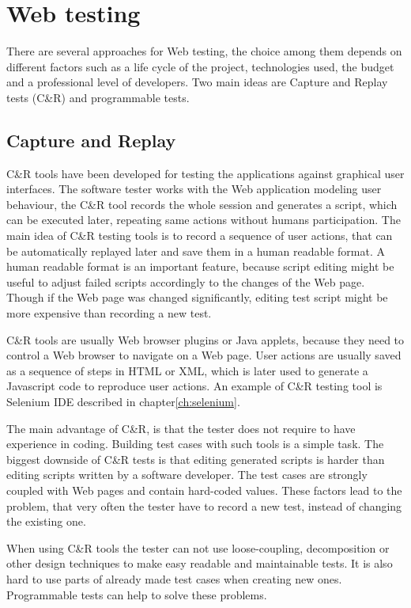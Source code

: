 	\chapter{Web testing}
	\label{ch:Webtesting}

		There are several approaches for Web testing, the choice among them depends on
		different factors such as a life cycle of the project, technologies used, the
		budget and a professional level of developers. Two main ideas are Capture
		and Replay tests (C\&R) and programmable tests.
		
\section{Capture and Replay}
\label{sec:captureReplay}
C\&R tools have been developed for testing the applications against graphical user interfaces. 
The software tester works with the Web application modeling user behaviour,
the C\&R tool records the whole session and generates a
script, which can be executed later,	repeating same actions without humans participation.
The main idea of C\&R
testing tools is to record a sequence of user actions, that can be
automatically replayed later and save them in a human readable format. A human
readable format is an important feature, because script editing might
be useful to adjust failed scripts accordingly	to the changes of the Web page.
Though if the Web page was changed	significantly, editing test script might be more expensive than recording a
new test\cite{CaptureReplay7}. 
			
C\&R tools are usually Web browser plugins or Java applets, because they
need to control a Web browser to navigate on a Web page. User actions are
usually saved as a sequence of steps in HTML or XML, which is later used to
generate a Javascript code to reproduce user actions. An example of C\&R testing
tool is Selenium IDE described in chapter\ref{ch:selenium}.

The main advantage of C\&R, is that the tester does not
require to have experience in coding. Building test cases with such tools
is a simple task.
The biggest downside of C\&R tests is that editing generated
scripts is harder than editing scripts written by a software
developer\cite{CaptureReplay7}. The test cases are strongly coupled with Web pages
 and contain hard-coded values. These factors lead to the
problem, that very often the tester have to record a new test, instead of
changing the existing one.

 When using C\&R tools the tester can
not use loose-coupling, decomposition or other design techniques to make
easy readable and maintainable tests. It is also hard to use parts of already
made test cases when creating new ones. Programmable tests can help to solve these problems.

